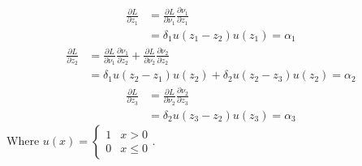 \documentclass[11pt]{scrartcl} %
\begin{document}
\subsection{} %
\begin{equation}
	\begin{aligned}
	\frac{\partial L}{\partial z_1} &= \frac{\partial L}{\partial \nu_1} \frac{\partial \nu_1}{\partial z_1} \\
	&= \delta_1 u(z_1 - z_2) u(z_1) = \alpha_1
	\end{aligned}
\end{equation}
\begin{equation}
	\begin{aligned}
	\frac{\partial L}{\partial z_2} &= \frac{\partial L}{\partial \nu_1} \frac{\partial \nu_1}{\partial z_2} + \frac{\partial L}{\partial \nu_2} \frac{\partial \nu_2}{\partial z_2} \\
	&= \delta_1 u(z_2 - z_1) u(z_2) + \delta_2 u(z_2 - z_3) u(z_2) = \alpha_2
	\end{aligned}
\end{equation}
\begin{equation}
	\begin{aligned}
	\frac{\partial L}{\partial z_3} &= \frac{\partial L}{\partial \nu_2} \frac{\partial \nu_2}{\partial z_3} \\
	&= \delta_2 u(z_3 - z_2) u(z_3) = \alpha_3
	\end{aligned}
\end{equation}
Where $ u(x) = \begin{cases} 1 & x > 0 \\ 0 & x \leq 0 \end{cases} $.
\end{document}
